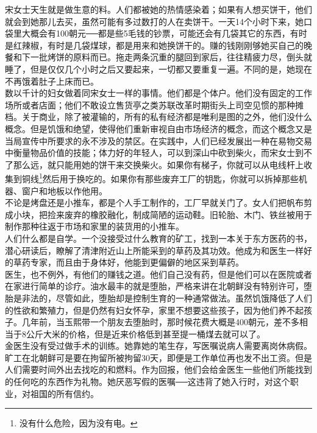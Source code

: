 \begin{multicols}{\theparacolNo}
宋女士天生就是做生意的料。人们都被她的热情感染着；如果有人想买饼干，他们就会到她那儿去买，虽然可能有多过数打的人在卖饼干。一天14个小时下来，她口袋里大概会有100朝元──都是些5毛钱的钞票，可能还会有几袋其它的东西，有时是红辣椒，有时是几袋煤球，都是用来和她换饼干的。赚的钱刚刚够她买自己的晚餐和下一批烤饼的原料而已。拖走两条沉重的腿回到家后，往往精疲力尽，倒头就睡了，但是仅仅几个小时之后又要起来，一切都又要重复一遍。不同的是，她现在不再饿着肚子上床而已。\\

数以千计的妇女做着同宋女士一样的事情。他们都是个体户。他们没有固定的工作场所或者店面；他们不敢设立售货亭之类苏联改革时期街头上司空见惯的那种摊档。关于商业，除了被灌输的，所有的私有经济都是唯利是图的之外，他们没什么概念。但是饥饿和绝望，使得他们重新审视自由市场经济的概念，而这个概念又是当局宣传中所要求的永不涉及的禁区。在实践中，人们已经发展出一种在易物交易中衡量物品价值的技能；体力好的年轻人，可以到深山中砍到柴火，而宋女士到不了那么远，就只能用她的饼干来交换柴火。如果你有梯子，你就可以从电线杆上收集到铜线\footnote{没有什么危险，因为没有电。}然后用于换吃的。如果你有那些废弃工厂的钥匙，你就可以拆掉那些机器、窗户和地板以作他用。\\

不论是烤盘还是小推车，都是个人手工制作的，工厂早就关门了。女人们把帆布剪成小块，把捡来废弃的橡胶融化，制成简陋的运动鞋。旧轮胎、木门、铁丝被用于制作那种往返于市场和家里的装货用的小推车。\\

人们什么都是自学。一个没接受过什么教育的矿工，找到一本关于东方医药的书，潜心研读后，瞭解了清津附近山上所能采到的草药及其功效。他成为和医生一样好的草药专家，而且由于身体好，他能到更偏僻的地区采到草药。\\

医生，也不例外，有他们的赚钱之道。他们自己没有药，但是他们可以在医院或者在家进行简单的诊疗。油水最丰的就是堕胎，严格来讲在北朝鲜没有特别许可，堕胎是非法的，尽管如此，堕胎却是控制生育的一种通常做法。虽然饥饿降低了人们的性欲和繁殖力，但是仍然有妇女怀孕，家里不想要这些孩子，因为他们养不起孩子。几年前，当玉熙带一个朋友去堕胎时，那时候花费大概是400朝元，差不多相当于8公斤大米的价格，但是近来价格低到甚至提一桶煤去就可以了。\\

金医生没有受过做手术的训练。她靠她的笔生存，写医嘱说病人需要离岗休病假。旷工在北朝鲜可是要在拘留所被拘留30天，即便是工作单位再也发不出工资。但是人们需要时间外出去找吃的和燃料。作为回报，他们会给金医生一些他们所能找到的任何吃的东西作为礼物。她厌恶写假的医嘱──这违背了她入行时，对这个职业，对祖国的所有信约。\\


\end{multicols}
